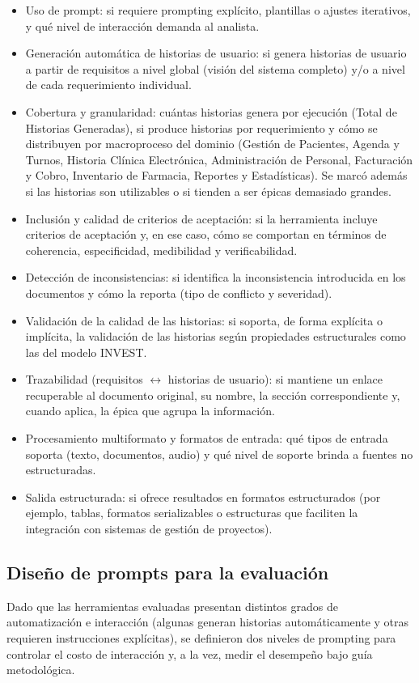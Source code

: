 \begin{itemize}
    \item Uso de prompt: si requiere prompting explícito, plantillas o ajustes iterativos, y qué nivel de interacción demanda al analista.
    \item Generación automática de historias de usuario: si genera historias de usuario a partir de requisitos a nivel global (visión del sistema completo) y/o a nivel de cada requerimiento individual.
    \item Cobertura y granularidad: cuántas historias genera por ejecución (Total de Historias Generadas), si produce historias por requerimiento y cómo se distribuyen por macroproceso del dominio (Gestión de Pacientes, Agenda y Turnos, Historia Clínica Electrónica, Administración de Personal, Facturación y Cobro, Inventario de Farmacia, Reportes y Estadísticas). Se marcó además si las historias son utilizables o si tienden a ser épicas demasiado grandes.
    \item Inclusión y calidad de criterios de aceptación: si la herramienta incluye criterios de aceptación y, en ese caso, cómo se comportan en términos de coherencia, especificidad, medibilidad y verificabilidad.
    \item Detección de inconsistencias: si identifica la inconsistencia introducida en los documentos y cómo la reporta (tipo de conflicto y severidad).
    \item Validación de la calidad de las historias: si soporta, de forma explícita o implícita, la validación de las historias según propiedades estructurales como las del modelo INVEST.
    \item Trazabilidad (requisitos $\leftrightarrow$ historias de usuario): si mantiene un enlace recuperable al documento original, su nombre, la sección correspondiente y, cuando aplica, la épica que agrupa la información.
    \item Procesamiento multiformato y formatos de entrada: qué tipos de entrada soporta (texto, documentos, audio) y qué nivel de soporte brinda a fuentes no estructuradas.
    \item Salida estructurada: si ofrece resultados en formatos estructurados (por ejemplo, tablas, formatos serializables o estructuras que faciliten la integración con sistemas de gestión de proyectos).
\end{itemize}

\subsection{Diseño de prompts para la evaluación}
Dado que las herramientas evaluadas presentan distintos grados de automatización e interacción (algunas generan historias automáticamente y otras requieren instrucciones explícitas), se definieron dos niveles de prompting para controlar el costo de interacción y, a la vez, medir el desempeño bajo guía metodológica.

